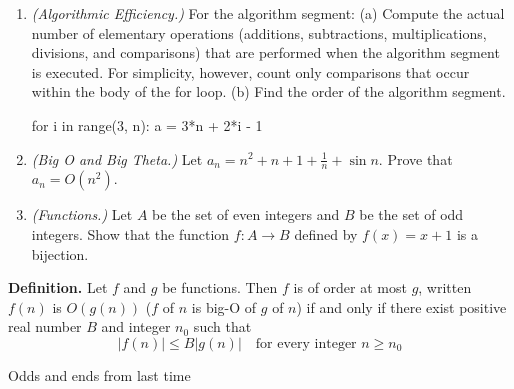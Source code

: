 \documentclass[10pt]{beamer}
\begin{document}
\begin{frame}[fragile]
\footnotesize 
 \begin{myredbox}[title=\text{Weekly Quiz \#9}] 
\begin{enumerate}
\item \textit{(Algorithmic Efficiency.)}  For the algorithm segment: (a) Compute the actual number of elementary operations (additions, subtractions, multiplications, divisions, and comparisons) that are performed when the algorithm segment is executed. For simplicity, however, count only comparisons that occur within the body of the for loop. (b) Find the order of the algorithm segment.
	\begin{python}[basicstyle=\ttfamily\scriptsize, numbers=none, columns=fullflexible, keepspaces=true]
for i in range(3, n):
    a = 3*n + 2*i - 1
	\end{python}
\item \textit{(Big O and Big Theta.)}  Let $a_n = n^2 + n + 1 + \frac{1}{n} + \sin n$. Prove that $a_n = O(n^2)$.
\item \textit{(Functions.)}  Let $A$ be the set of even integers and $B$ be the set of odd integers.  Show that the function $f: A \to B$ defined by $f(x)=x+1$ is a bijection.
\end{enumerate}
\end{myredbox}
\vfill 
\colorbox{green!30}{\textbf{Definition.}} Let $f$ and $g$ be functions. Then $f$ is of order at most $g$, written $f(n)$ is $O(g(n))$ ($f$ of $n$ is big-O of $g$ of $n$) if and only if there exist positive real number $B$ and integer $n_0$ such that
\[  |f(n)| \leq B |g(n)| \quad \text{for every integer } n \geq n_0\]	


\end{frame}


\begin{frame}[standout]
Odds and ends from last time
\end{frame}
\end{document}
